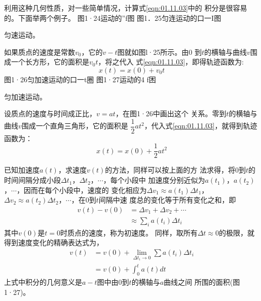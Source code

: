     利用这种几何性质，对一些简单情况，计算式\eqref{eqn:01.11.03}中的
积分是很容易的。下面举两个例子。
    图1·24运动的”f图    图1．25匀连运动的口一I图

    \example 匀速运动。

    如果质点的速度是常数$v_0$，它的$v-t$图就如图l·25所示。由0
到$t$的横轴与曲线$v$围成一个长方形，它的面积是$v_0t$，将之代入
式\eqref{eqn:01.11.03}，即得轨迹函数为:
\begin{equation}\label{eqn:01.11.04}
    x(t)=x(0)+v_0 t
\end{equation}
图1·26匀加速运动的口一t圈    图1·27运动的4 f困

  \example 匀加速运动。

  设质点的速度与时间成正比，$v=at$，在图1·26中画出这个
关系。零到$t$的横轴与曲线$v$围成一个直角三角形，它的面积是
$\dfrac{1}{2} a t^2$，代入式\eqref{eqn:01.11.03}，就得到轨迹函数为：
\begin{equation*}\label{eqn:01.11.04i}
    x(t)=x(0)+\frac{1}{2}at^2 \tag{1.11.4$'$}
\end{equation*}

    已知加速度$a(t)$，求速度$v(t)$的方法，同样可以按上面的方
法求得，将0到$t$的时间间隔分成小段$\Delta t_1$，$\Delta t_2$，$\cdots$，每个小段中
加速度分别近似为$a(t_1)$，$a(t_2)$，$\cdots$，因而在每个小段中，速度的
变化相应为$\Delta v_1\approx a(t_1)\Delta t_1$，$\Delta v_2\approx a(t_2)\Delta t_2$，$\cdots$，在0到$t$间隔中速
度总的变化等于所有变化之和，即
\begin{equation}\label{eqn:01.11.05}
    \begin{aligned}
        v(t)-v(0) &=\Delta v_{1}+\Delta v_{2}+\cdots \\
        & \approx \sum_{i} a\left(t_{i}\right) \Delta t_{i}
    \end{aligned}
\end{equation}
其中$v(0)$是$t=0$时质点的速度，称为初速度。
同样，取所有$\Delta t\approx 0$的极限，就得到速度变化的精确表达式为，
\begin{equation}\label{eqn:01.11.06}
    \begin{aligned}
        v(t) &=v(0)+\lim _{\Delta t_{i} \rightarrow 0} \sum a(t_{i}) \Delta t_{i} \\
        &=v(0)+\int_{0}^{t} a(t) d t
    \end{aligned}
\end{equation}
上式中积分的几何意义是$a-t$图中由0到$t$的横轴与$a$曲线之间
所围的面积(图1·27)。

